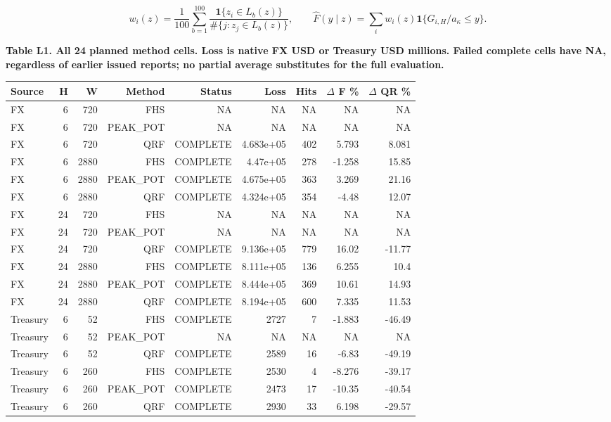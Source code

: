 \documentclass[10pt,a4paper]{article}
\begin{document}
\[
w_i(z)=\frac1{100}\sum_{b=1}^{100}\frac{\mathbf1\{z_i\in L_b(z)\}}{\#\{j:z_j\in L_b(z)\}},\qquad\hat F(y\mid z)=\sum_iw_i(z)\mathbf1\{G_{i,H}/a_\kappa\le y\}.
\]
\begin{center}
\begin{minipage}{\linewidth}
\small\textbf{Table L1. All 24 planned method cells. Loss is native FX USD or Treasury USD millions. Failed complete cells have NA, regardless of earlier issued reports; no partial average substitutes for the full evaluation.}\par\medskip
\centering\fontsize{8}{10}\selectfont
\begin{tabular}{lrrrrrrrr}
\toprule
Source & H & W & Method & Status & Loss & Hits & \(\Delta\) F \% & \(\Delta\) QR \% \\
\midrule
FX & 6 & 720 & FHS & NA & NA & NA & NA & NA \\
FX & 6 & 720 & PEAK\_POT & NA & NA & NA & NA & NA \\
FX & 6 & 720 & QRF & COMPLETE & 4.683e+05 & 402 & 5.793 & 8.081 \\
FX & 6 & 2880 & FHS & COMPLETE & 4.47e+05 & 278 & -1.258 & 15.85 \\
FX & 6 & 2880 & PEAK\_POT & COMPLETE & 4.675e+05 & 363 & 3.269 & 21.16 \\
FX & 6 & 2880 & QRF & COMPLETE & 4.324e+05 & 354 & -4.48 & 12.07 \\
FX & 24 & 720 & FHS & NA & NA & NA & NA & NA \\
FX & 24 & 720 & PEAK\_POT & NA & NA & NA & NA & NA \\
FX & 24 & 720 & QRF & COMPLETE & 9.136e+05 & 779 & 16.02 & -11.77 \\
FX & 24 & 2880 & FHS & COMPLETE & 8.111e+05 & 136 & 6.255 & 10.4 \\
FX & 24 & 2880 & PEAK\_POT & COMPLETE & 8.444e+05 & 369 & 10.61 & 14.93 \\
FX & 24 & 2880 & QRF & COMPLETE & 8.194e+05 & 600 & 7.335 & 11.53 \\
Treasury & 6 & 52 & FHS & COMPLETE & 2727 & 7 & -1.883 & -46.49 \\
Treasury & 6 & 52 & PEAK\_POT & NA & NA & NA & NA & NA \\
Treasury & 6 & 52 & QRF & COMPLETE & 2589 & 16 & -6.83 & -49.19 \\
Treasury & 6 & 260 & FHS & COMPLETE & 2530 & 4 & -8.276 & -39.17 \\
Treasury & 6 & 260 & PEAK\_POT & COMPLETE & 2473 & 17 & -10.35 & -40.54 \\
Treasury & 6 & 260 & QRF & COMPLETE & 2930 & 33 & 6.198 & -29.57 \\

\end{tabular}
\end{minipage}
\end{center}
\end{document}
